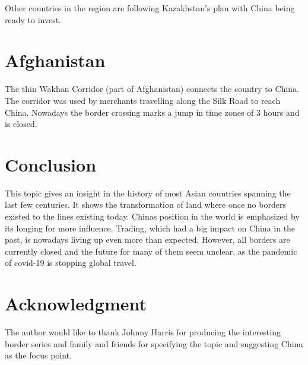 \documentclass[conference]{IEEEtran}
\begin{document}
	Other countries in the region are following Kazakhstan's plan with China being ready to invest.
	
	\section{Afghanistan}
	The thin Wakhan Corridor (part of Afghanistan) connects the country to China. The corridor was used by merchants travelling along the Silk Road to reach China. Nowadays the border crossing marks a jump in time zones of 3 hours and is closed.
	
	\section{Conclusion}
	This topic gives an insight in the history of most Asian countries spanning the last few centuries. It shows the transformation of land where once no borders existed to the lines existing today. Chinas position in the world is emphasized by its longing for more influence. Trading, which had a big impact on China in the past, is nowadays living up even more than expected. However, all borders are currently closed and the future for many of them seem unclear, as the pandemic of covid-19 is stopping global travel.
	
	\section*{Acknowledgment}
	The author would like to thank Johnny Harris for producing the interesting border series and family and friends for specifying the topic and suggesting China as the focus point.
	
	
	
\end{document}
